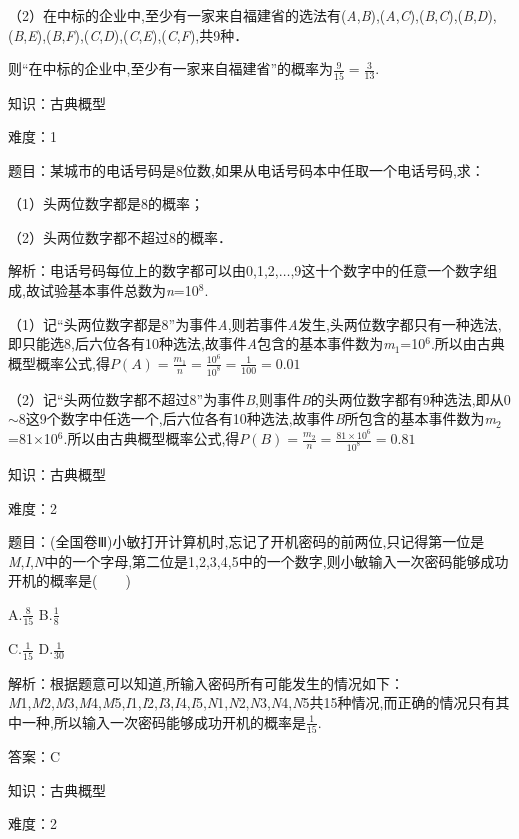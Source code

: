 \documentclass{article} %
\begin{document}
（2）在中标的企业中,至少有一家来自福建省的选法有(\textit{A},\textit{B}),(\textit{A},\textit{C}),(\textit{B},\textit{C}),(\textit{B},\textit{D}),(\textit{B},\textit{E}),(\textit{B},\textit{F}),(\textit{C},\textit{D}),(\textit{C},\textit{E}),(\textit{C},\textit{F}),共9种．

则``在中标的企业中,至少有一家来自福建省''的概率为$\frac{9}{15}=\frac{3}{13}$.

知识：古典概型

难度：1

题目：某城市的电话号码是8位数,如果从电话号码本中任取一个电话号码,求：

（1）头两位数字都是8的概率；

（2）头两位数字都不超过8的概率．

解析：电话号码每位上的数字都可以由0,1,2,$\dots$,9这十个数字中的任意一个数字组成,故试验基本事件总数为\textit{n}=10${}^{8}$.

（1）记``头两位数字都是8''为事件\textit{A},则若事件\textit{A}发生,头两位数字都只有一种选法,即只能选8,后六位各有10种选法,故事件\textit{A}包含的基本事件数为\textit{m}${}_{1}$=10${}^{6}$.所以由古典概型概率公式,得$P(A)=\frac{m_1}{n}=\frac{10^6}{10^8}=\frac{1}{100}=0.01$

（2）记``头两位数字都不超过8''为事件\textit{B},则事件\textit{B}的头两位数字都有9种选法,即从0$\sim$8这9个数字中任选一个,后六位各有10种选法,故事件\textit{B}所包含的基本事件数为\textit{m}${}_{2}$=81$\mathrm{\times}$10${}^{6}$.所以由古典概型概率公式,得$P(B)=\frac{m_2}{n}=\frac{81\times10^6}{10^8}=0.81$

知识：古典概型

难度：2

题目：(全国卷Ⅲ)小敏打开计算机时,忘记了开机密码的前两位,只记得第一位是\textit{M},\textit{I},\textit{N}中的一个字母,第二位是1,2,3,4,5中的一个数字,则小敏输入一次密码能够成功开机的概率是(　　)

A.$\frac{8}{15}$  B.$\frac{1}{8}$

C.$\frac{1}{15}$  D.$\frac{1}{30}$

解析：根据题意可以知道,所输入密码所有可能发生的情况如下：\textit{M}1,\textit{M}2,\textit{M}3,\textit{M}4,\textit{M}5,\textit{I}1,\textit{I}2,\textit{I}3,\textit{I}4,\textit{I}5,\textit{N}1,\textit{N}2,\textit{N}3,\textit{N}4,\textit{N}5共15种情况,而正确的情况只有其中一种,所以输入一次密码能够成功开机的概率是$\frac{1}{15}$.

答案：C

知识：古典概型

难度：2
\end{document}
